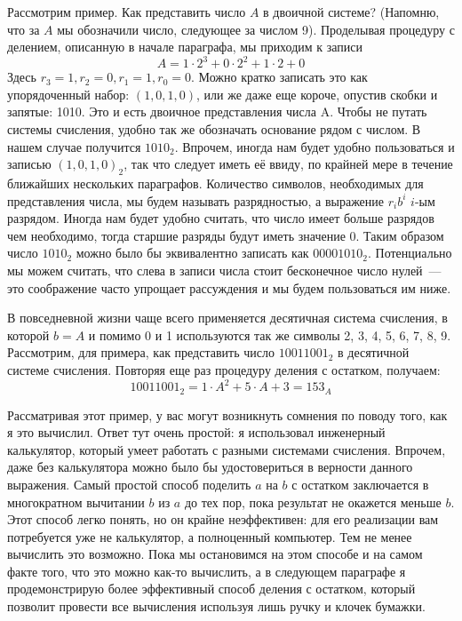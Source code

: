 Рассмотрим пример. Как представить число $A$ в двоичной системе? (Напомню, что за $A$ мы обозначили число, следующее за числом 9). Проделывая процедуру с делением, описанную в начале параграфа, мы приходим к записи
$$A = 1\cdot 2^3 + 0\cdot 2^2 + 1\cdot 2 + 0$$
Здесь $r_3 = 1, r_2 = 0, r_1 = 1, r_0 = 0$. Можно кратко записать это как упорядоченный набор: $(1, 0, 1, 0)$, или же даже еще короче, опустив скобки и запятые: 1010. Это и есть двоичное представления числа A. Чтобы не путать системы счисления, удобно так же обозначать основание рядом с числом. В нашем случае получится $1010_2$. Впрочем, иногда нам будет удобно пользоваться и записью $(1, 0, 1, 0)_2$, так что следует иметь её ввиду, по крайней мере в течение ближайших нескольких параграфов. Количество символов, необходимых для представления числа, мы будем называть разрядностью, а выражение $r_ib^i$ $i$-ым разрядом. Иногда нам будет удобно считать, что число имеет больше разрядов чем необходимо, тогда старшие разряды будут иметь значение 0. Таким образом число $1010_2$ можно было бы эквивалентно записать как $00001010_2$. Потенциально мы можем считать, что слева в записи числа стоит бесконечное число нулей~--- это соображение часто упрощает рассуждения и мы будем пользоваться им ниже.

В повседневной жизни чаще всего применяется десятичная система счисления, в которой $b=A$ и помимо 0 и 1 используются так же символы 2, 3, 4, 5, 6, 7, 8, 9. Рассмотрим, для примера, как представить число $10011001_2$ в десятичной системе счисления. Повторяя еще раз процедуру деления с остатком, получаем:
$$10011001_2 = 1\cdot A^2 + 5\cdot A + 3 = 153_A$$

Рассматривая этот пример, у вас могут возникнуть сомнения по поводу того, как я это вычислил. Ответ тут очень простой: я использовал инженерный калькулятор, который умеет работать с разными системами счисления. Впрочем, даже без калькулятора можно было бы удостовериться в верности данного выражения. Самый простой способ поделить $a$ на $b$ с остатком заключается в многократном вычитании $b$ из $a$ до тех пор, пока результат не окажется меньше $b$. Этот способ легко понять, но он крайне неэффективен: для его реализации вам потребуется уже не калькулятор, а полноценный компьютер. Тем не менее вычислить это возможно. Пока мы остановимся на этом способе и на самом факте того, что это можно как-то вычислить, а в следующем параграфе я продемонстрирую более эффективный способ деления с остатком, который позволит провести все вычисления используя лишь ручку и клочек бумажки.

